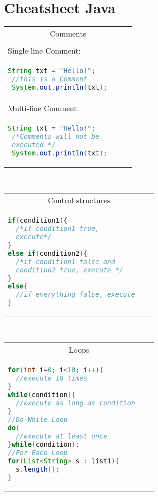 \documentclass[a4paper, 8pt]{extarticle}
\begin{document}
\section*{Cheatsheet Java}\vspace{-10pt}
\begin{minipage}[t]{0.25\linewidth}\vspace{0pt}
\begin{tabular}{|p{0.9\linewidth}|}

\multicolumn{1}{|c|}{\cellcolor{headcol}\color{white}Comments}\\
\\[-7pt]
Single-line Comment:
\\[-3pt]
\begin{lstlisting}[language=Java, aboveskip=-2pt,belowskip=-6pt]
 String txt = "Hello!";
 //this is a Comment
 System.out.println(txt);\end{lstlisting}
 \\
 Multi-line Comment:
 \\[-3pt]
 \begin{lstlisting}[language=Java, aboveskip=-2pt,belowskip=-6pt,mathescape]
 String txt = "Hello!";
 /*Comments will not be
 executed */
 System.out.println(txt);  
\end{lstlisting}
\\
\hline
\end{tabular}
\\[3pt]
\begin{tabular}[t]{|p{0.9\linewidth}|}

\multicolumn{1}{|c|}{\cellcolor{headcol}\color{white} Control structures}
\\
\begin{lstlisting}[language=Java, mathescape, aboveskip=-2pt,belowskip=-7pt]
if(condition1){
  /*if condition1 true, 
  execute*/
}
else if(condition2){
  /*if condition1 false and
  condition2 true, execute */
}
else{
  //if everything false, execute
}\end{lstlisting}
\\\hline
\end{tabular}
\\[3pt]
\begin{tabular}[t]{|p{0.9\linewidth}|}

\multicolumn{1}{|c|}{\cellcolor{headcol}\color{white}Loops}
\\
\begin{lstlisting}[language=Java, mathescape, aboveskip=-2pt,belowskip=-7pt]
for(int i=0; i<10; i++){
  //execute 10 times
}
while(condition){
  //execute as long as condition
}
//Do-While Loop
do{
  //execute at least once
}while(condition);
//For-Each Loop
for(List<String> s : list1){
  s.length();
}
\end{lstlisting}
\\\hline
\end{tabular}
\\[3pt]
\begin{tabular}[t]{|p{0.9\linewidth}|}


\end{tabular}
\end{minipage}
\end{document}
